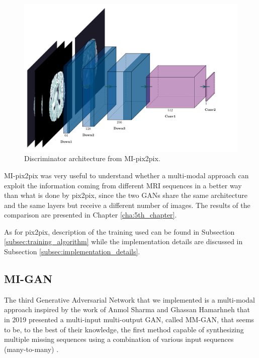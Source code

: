\begin{figure}[H]
\centering
\includegraphics[height=0.335\textheight]{images/MIpix2pix_discriminator.pdf}
\caption[Discriminator architecture from MI-pix2pix]{Discriminator architecture from MI-pix2pix.}
\label{fig:MIpix2pix_discriminator}
\end{figure}



\noindent MI-pix2pix was very useful to understand whether a multi-modal approach can exploit the information coming from different \ac{MRI} sequences in a better way than what is done by pix2pix, since the two \ac{GAN}s share the same architecture and the same layers but receive a different number of images. The results of the comparison are presented in Chapter \ref{cha:5th_chapter}.

\vspace{2mm} %
As for pix2pix, description of the training used can be found in Subsection \ref{subsec:training_algorithm} while the implementation details are discussed in Subsection \ref{subsec:implementation_details}.

\subsection{MI-GAN}
\label{subsec:mi_gan_architecture}
The third Generative Adversarial Network that we implemented is a multi-modal approach inspired by the work of Anmol Sharma and Ghassan Hamarhneh that in 2019 presented a multi-input multi-output \ac{GAN}, called MM-GAN, that seems to be, to the best of their knowledge, the first method capable of synthesizing multiple missing sequences using a combination of various input sequences (many-to-many) \cite{migan}.

